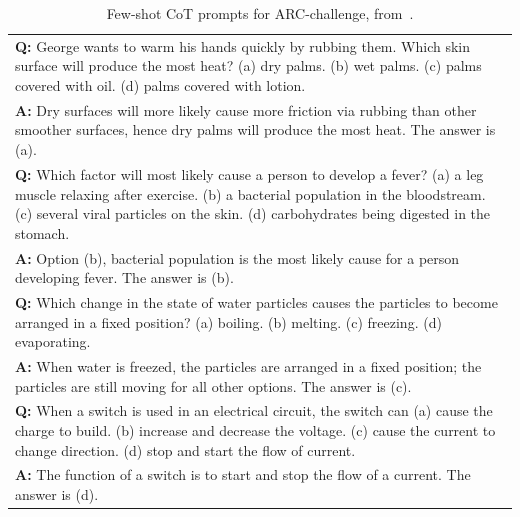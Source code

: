\begin{table}[h]
    \caption{
    Few-shot CoT prompts for ARC-challenge, from~\cite{Wang2022SelfConsistencyIC}.
    }
    \centering
    \small
    \begin{tabular}{p{13.5cm}}
        \toprule
        \textbf{Q:} George wants to warm his hands quickly by rubbing them. Which skin surface will produce the most heat? (a) dry palms. (b) wet palms. (c) palms covered with oil. (d) palms covered with lotion.\\
        \vspace{-1mm}
        \textbf{A:} Dry surfaces will more likely cause more friction via rubbing than other smoother surfaces, hence dry palms will produce the most heat. The answer is (a).\\
        \vspace{0mm}
        \textbf{Q:} Which factor will most likely cause a person to develop a fever? (a) a leg muscle relaxing after exercise. (b) a bacterial population in the bloodstream. (c) several viral particles on the skin. (d) carbohydrates being digested in the stomach.\\
        \vspace{-1mm}
        \textbf{A:} Option (b), bacterial population is the most likely cause for a person developing fever. The answer is (b). \\
        \vspace{0mm}
        \textbf{Q:} Which change in the state of water particles causes the particles to become arranged in a fixed position? (a) boiling. (b) melting. (c) freezing. (d) evaporating.\\
        \vspace{-1mm}
        \textbf{A:} When water is freezed, the particles are arranged in a fixed position; the particles are still moving for all other options. The answer is (c).\\
        \vspace{0mm}
        \textbf{Q:} When a switch is used in an electrical circuit, the switch can (a) cause the charge to build. (b) increase and decrease the voltage. (c) cause the current to change direction. (d) stop and start the flow of current.\\
        \vspace{-1mm}
        \textbf{A:} The function of a switch is to start and stop the flow of a current. The answer is (d).\\
        \bottomrule
    \end{tabular}
    \label{tab:prompt-arc}
\end{table}


